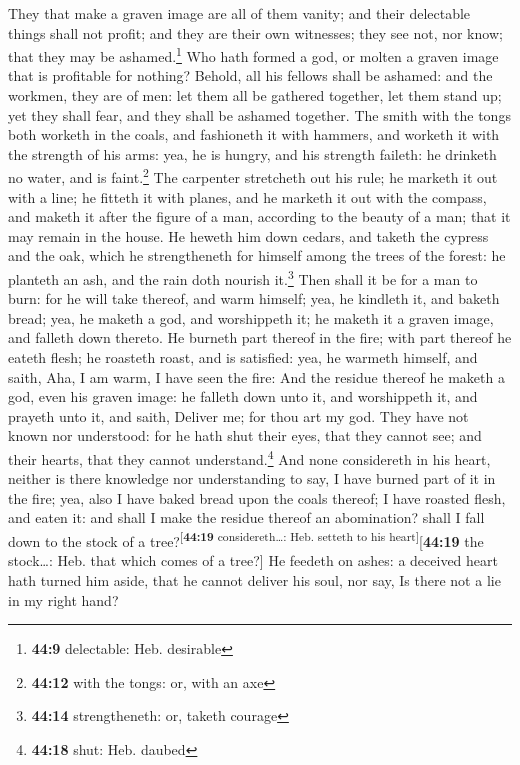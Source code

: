  They that make a graven image are all of them vanity; and
their delectable things shall not profit; and they are their own
witnesses; they see not, nor know; that they may be ashamed.\footnote{\textbf{44:9}
  delectable: Heb. desirable}  Who hath formed a god, or
molten a graven image that is profitable for nothing? 
Behold, all his fellows shall be ashamed: and the workmen, they are of
men: let them all be gathered together, let them stand up; yet they
shall fear, and they shall be ashamed together.  The
smith with the tongs both worketh in the coals, and fashioneth it with
hammers, and worketh it with the strength of his arms: yea, he is
hungry, and his strength faileth: he drinketh no water, and is
faint.\footnote{\textbf{44:12} with the tongs: or, with an axe}
 The carpenter stretcheth out his rule; he marketh it out
with a line; he fitteth it with planes, and he marketh it out with the
compass, and maketh it after the figure of a man, according to the
beauty of a man; that it may remain in the house.  He
heweth him down cedars, and taketh the cypress and the oak, which he
strengtheneth for himself among the trees of the forest: he planteth an
ash, and the rain doth nourish it.\footnote{\textbf{44:14}
  strengtheneth: or, taketh courage}  Then shall it be
for a man to burn: for he will take thereof, and warm himself; yea, he
kindleth it, and baketh bread; yea, he maketh a god, and worshippeth it;
he maketh it a graven image, and falleth down thereto. 
He burneth part thereof in the fire; with part thereof he eateth flesh;
he roasteth roast, and is satisfied: yea, he warmeth himself, and saith,
Aha, I am warm, I have seen the fire:  And the residue
thereof he maketh a god, even his graven image: he falleth down unto it,
and worshippeth it, and prayeth unto it, and saith, Deliver me; for thou
art my god.  They have not known nor understood: for he
hath shut their eyes, that they cannot see; and their hearts, that they
cannot understand.\footnote{\textbf{44:18} shut: Heb. daubed}
 And none considereth in his heart, neither is there
knowledge nor understanding to say, I have burned part of it in the
fire; yea, also I have baked bread upon the coals thereof; I have
roasted flesh, and eaten it: and shall I make the residue thereof an
abomination? shall I fall down to the stock of a
tree?\textsuperscript{{[}\textbf{44:19} considereth\ldots: Heb. setteth
to his heart{]}}{[}\textbf{44:19} the stock\ldots: Heb. that which comes
of a tree?{]}  He feedeth on ashes: a deceived heart hath
turned him aside, that he cannot deliver his soul, nor say, Is there not
a lie in my right hand?


